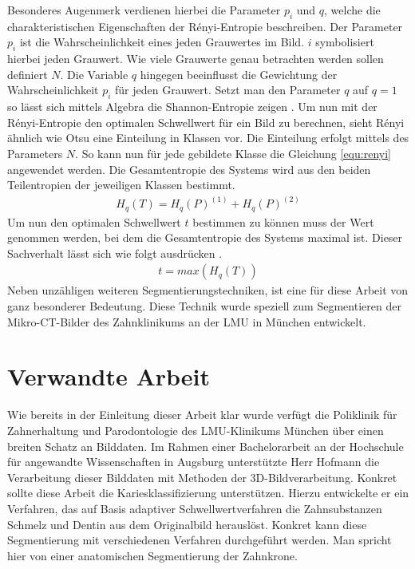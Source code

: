 Besonderes Augenmerk verdienen hierbei die Parameter $p_{i}$ und $q$, welche die
charakteristischen Eigenschaften der Rényi-Entropie beschreiben. Der Parameter $p
_{i}$ ist die Wahrscheinlichkeit eines jeden Grauwertes im Bild. $i$
symbolisiert hierbei jeden Grauwert. Wie viele Grauwerte genau betrachten werden
sollen definiert $N$. Die Variable $q$ hingegen beeinflusst die Gewichtung der
Wahrscheinlichkeit $p_{i}$ für jeden Grauwert. Setzt man den Parameter $q$ auf $q
= 1$ so lässt sich mittels Algebra die Shannon-Entropie zeigen \citep[vgl.][K.~2]{bromiley2004}.
Um nun mit der Rényi-Entropie den optimalen Schwellwert für ein Bild zu berechnen,
sieht Rényi ähnlich wie Otsu eine Einteilung in Klassen vor. Die Einteilung erfolgt
mittels des Parameters $N$. So kann nun für jede gebildete Klasse die Gleichung
\ref{equ:renyi} angewendet werden. Die Gesamtentropie des Systems wird aus den beiden
Teilentropien der jeweiligen Klassen bestimmt\citep[vgl.][K.~2]{bromiley2004}.
\begin{align}
	H_{q}(T) = H_{q}(P)^{(1)}+ H_{q}(P)^{(2)}
\end{align}
Um nun den optimalen Schwellwert $t$ bestimmen zu können muss der Wert genommen
werden, bei dem die Gesamtentropie des Systems maximal ist. Dieser Sachverhalt
lässt sich wie folgt ausdrücken \citep[vgl.][K.~2]{bromiley2004}.
\begin{align}
	t = max(H_{q}(T))
\end{align}
Neben unzähligen weiteren Segmentierungstechniken, ist eine für diese Arbeit von
ganz besonderer Bedeutung. Diese Technik wurde speziell zum Segmentieren der
Mikro-\ac{CT}-Bilder des Zahnklinikums an der \ac{LMU} in München entwickelt.

\pagebreak

\section{Verwandte Arbeit}
\label{sec:verwwandte_arbeit} Wie bereits in der Einleitung dieser Arbeit klar wurde
verfügt die Poliklinik für Zahnerhaltung und Parodontologie des \ac{LMU}-Klinikums
München über einen breiten Schatz an Bilddaten. Im Rahmen einer Bachelorarbeit an
der Hochschule für angewandte Wissenschaften in Augsburg unterstützte Herr Hofmann
die Verarbeitung dieser Bilddaten mit Methoden der 3D-Bildverarbeitung. Konkret
sollte diese Arbeit die Kariesklassifizierung unterstützen. Hierzu entwickelte er
ein Verfahren, das auf Basis adaptiver Schwellwertverfahren die Zahnsubstanzen
Schmelz und Dentin aus dem Originalbild herauslöst. Konkret kann diese Segmentierung
mit verschiedenen Verfahren durchgeführt werden. Man spricht hier von einer
anatomischen Segmentierung der Zahnkrone.

